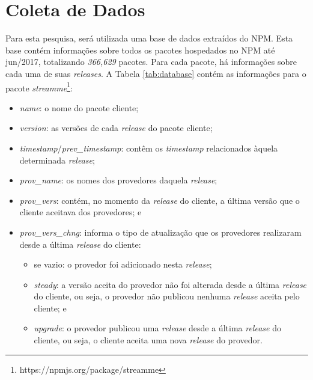 \chapter{Coleta de Dados}
\label{cap:coleta-dados}

Para esta pesquisa, será utilizada uma base de dados extraídos do \gls{NPM}. Esta base contém informações sobre todos os pacotes hospedados no \gls{NPM} até jun/2017, totalizando \textit{366,629} pacotes. Para cada pacote, há informações sobre cada uma de suas \textit{releases}. A Tabela \ref{tab:database} contém as informações para o pacote \textit{streamme}\footnote{https://npmjs.org/package/streamme}:

\begin{itemize}
    \item \textit{name}: o nome do pacote cliente;
    \item \textit{version}: as versões de cada \textit{release} do pacote cliente;
    \item \textit{timestamp}/\textit{prev\_timestamp}: contêm os \textit{timestamp} relacionados àquela determinada \textit{release};
    \item \textit{prov\_name}: os nomes dos provedores daquela \textit{release};
    \item \textit{prov\_vers}: contém, no momento da \textit{release} do cliente, a última versão que o cliente aceitava dos provedores; e
    \item \textit{prov\_vers\_chng}: informa o tipo de atualização que os provedores realizaram desde a última \textit{release} do cliente:
    \begin{itemize}
        \item se vazio: o provedor foi adicionado nesta \textit{release};
        \item \textit{steady}: a versão aceita do provedor não foi alterada desde a última \textit{release} do cliente, ou seja, o provedor não publicou nenhuma \textit{release} aceita pelo cliente; e
        \item \textit{upgrade}: o provedor publicou uma \textit{release} desde a última \textit{release} do cliente, ou seja, o cliente aceita uma nova \textit{release} do provedor.
    \end{itemize}
\end{itemize}{}


